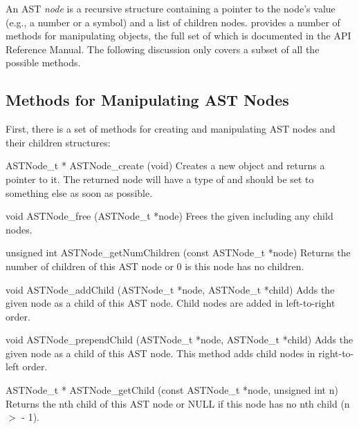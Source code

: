 \documentclass{sbmlmanual}
\begin{document}
An AST \emph{node} is a recursive structure containing a pointer to the
node's value (e.g., a number or a symbol) and a list of children nodes.
\libsbml{} provides a number of methods for manipulating 
objects, the full set of which is documented in the \libsbml{} API
Reference Manual.   The following discussion only covers a subset of all
the possible methods.


\subsection{Methods for Manipulating AST Nodes}

First, there is a set of methods for creating and manipulating \libsbml{}
AST nodes and their children structures:

\begin{methoddef}{ASTNode\_t * ASTNode\_create (void)}
  Creates a new  object and returns a pointer to it.  The
  returned node will have a type of  and should be set
  to something else as soon as possible.
\end{methoddef}


\begin{methoddef}{void ASTNode\_free (ASTNode\_t *node)}
  Frees the given  including any child nodes.
\end{methoddef}


\begin{methoddef}{unsigned int ASTNode\_getNumChildren (const ASTNode\_t *node)}
  Returns the number of children of this AST node or 0 is this node has no
  children.
\end{methoddef}


\begin{methoddef}{void ASTNode\_addChild (ASTNode\_t *node, ASTNode\_t *child)}
  Adds the given node as a child of this AST node.  Child nodes are added
  in left-to-right order.
\end{methoddef}


\begin{methoddef}{void ASTNode\_prependChild (ASTNode\_t *node, ASTNode\_t *child)}
  Adds the given node as a child of this AST node.  This method adds child
  nodes in right-to-left order.
\end{methoddef}


\begin{methoddef}{ASTNode\_t * ASTNode\_getChild (const ASTNode\_t *node, unsigned int n)}
  Returns the nth child of this AST node or NULL if this node has no nth
  child (n $>$  - 1).
\end{methoddef}
\end{document}
